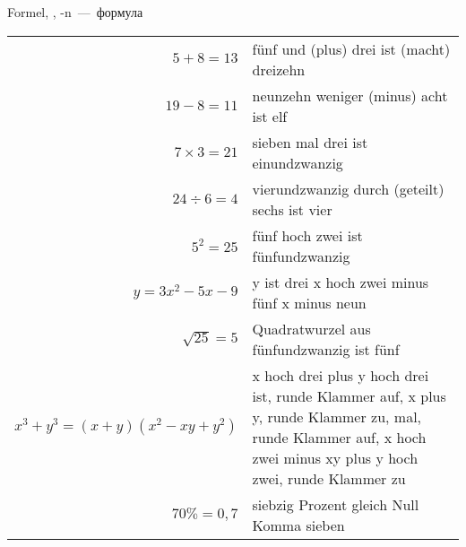 
 Formel, \Fall{=}, -n~---~формула

\begin{longtable}{rp{7cm}}
$5 + 8 = 13$ & f\"unf und (plus) drei ist (macht) dreizehn \\
$19 - 8 = 11$ & neunzehn weniger (minus) acht ist elf \\
$7 \times 3 = 21$ & sieben mal drei ist einundzwanzig \\
$24 \div 6 = 4$ & vierundzwanzig durch (geteilt) sechs ist vier \\
$5^2 = 25$ & f\"unf hoch zwei ist fünfundzwanzig \\
$y = 3x^2 - 5x - 9$ & y ist drei x hoch zwei minus f\"unf x minus neun \\
$\sqrt{25} = 5$ & Quadratwurzel aus f\"unfundzwanzig ist f\"unf \\
$x^3 + y^3 = (x + y)(x^2 - xy + y^2)$ & x hoch drei plus y hoch drei ist, runde Klammer auf, x plus y, runde Klammer zu, mal, runde Klammer auf, x hoch zwei minus xy plus y hoch zwei, runde Klammer zu \\
$70\% = 0,7$ & siebzig Prozent gleich Null Komma sieben
\end{longtable}
